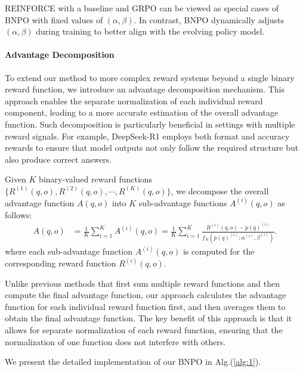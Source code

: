\documentclass{article}
\theoremstyle{plain}
\theoremstyle{definition}
\theoremstyle{remark}
\begin{document}
REINFORCE with a baseline and GRPO can be viewed as special cases of BNPO with fixed values of $(\alpha, \beta)$. In contrast, BNPO dynamically adjusts $(\alpha, \beta)$ during training to better align with the evolving policy model.

\paragraph{Advantage Decomposition}
To extend our method to more complex reward systems beyond a single binary reward function, we introduce an advantage decomposition mechanism. This approach enables the separate normalization of each individual reward component, leading to a more accurate estimation of the overall advantage function. Such decomposition is particularly beneficial in settings with multiple reward signals. For example, DeepSeek-R1 employs both format and accuracy rewards to ensure that model outputs not only follow the required structure but also produce correct answers.

Given $K$ binary-valued reward functions $\{R^{(1)}(q,o),R^{(2)}(q,o),\cdots, R^{(K)}(q,o)\}$, we decompose the overall advantage function $A(q,o)$ into $K$ sub-advantage functions $A^{(i)}(q,o)$ as follows:
\begin{align}
\label{equation:17}
    A(q,o)&=\frac{1}{K}\sum_{i=1}^{K}A^{(i)}(q,o)= \frac{1}{K}\sum_{i=1}^{K}\frac{R^{(i)}(q,o)-p(q)^{(i)}}{f_{N}(p(q)^{(i)};\alpha^{(i)},\beta^{(i)})}.
\end{align}
where each sub-advantage function $A^{(i)}(q,o)$ is computed for the corresponding reward function $R^{(i)}(q,o)$.

Unlike previous methods that first sum multiple reward functions and then compute the final advantage function, our approach calculates the advantage function for each individual reward function first, and then averages them to obtain the final advantage function. The key benefit of this approach is that it allows for separate normalization of each reward function, ensuring that the normalization of one function does not interfere with others.

We present the detailed implementation of our BNPO in Alg.(\ref{alg:1}). 
\end{document}
